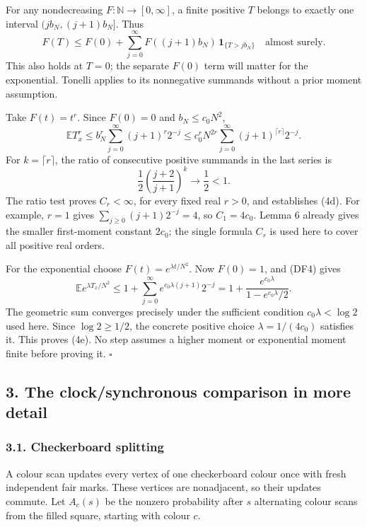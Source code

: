 \documentclass[
  11pt,
  a4paper,
]{article}
\begin{document}
For any nondecreasing \(F:\mathbb N\to[0,\infty]\), a finite positive
\(T\) belongs to exactly one interval \((jb_N,(j+1)b_N]\). Thus \[
F(T)\leq F(0)+\sum_{j=0}^{\infty}
 F((j+1)b_N)\,\mathbf1_{\{T>jb_N\}}
\quad\text{almost surely}.
\tag{DF4}
\] This also holds at \(T=0\); the separate \(F(0)\) term will matter
for the exponential. Tonelli applies to its nonnegative summands without
a prior moment assumption.

Take \(F(t)=t^r\). Since \(F(0)=0\) and \(b_N\leq c_0N^2\), \[
\mathbb E T_x^r
\leq b_N^r\sum_{j=0}^{\infty}(j+1)^r2^{-j}
\leq c_0^rN^{2r}\sum_{j=0}^{\infty}(j+1)^{\lceil r\rceil}2^{-j}.
\] For \(k=\lceil r\rceil\), the ratio of consecutive positive summands
in the last series is \[
\frac12\left(\frac{j+2}{j+1}\right)^k\longrightarrow\frac12<1.
\] The ratio test proves \(C_r<\infty\), for every fixed real \(r>0\),
and establishes (4d). For example, \(r=1\) gives
\(\sum_{j\geq0}(j+1)2^{-j}=4\), so \(C_1=4c_0\). Lemma 6 already gives
the smaller first-moment constant \(2c_0\); the single formula \(C_r\)
is used here to cover all positive real orders.

For the exponential choose \(F(t)=e^{\lambda t/N^2}\). Now \(F(0)=1\),
and (DF4) gives \[
\mathbb E e^{\lambda T_x/N^2}
\leq1+\sum_{j=0}^{\infty}e^{c_0\lambda(j+1)}2^{-j}
=1+\frac{e^{c_0\lambda}}{1-e^{c_0\lambda}/2}.
\] The geometric sum converges precisely under the sufficient condition
\(c_0\lambda<\log2\) used here. Since \(\log2\geq1/2\), the concrete
positive choice \(\lambda=1/(4c_0)\) satisfies it. This proves (4e). No
step assumes a higher moment or exponential moment finite before proving
it. \(\square\)

\subsection{3. The clock/synchronous comparison in more
detail}\label{the-clocksynchronous-comparison-in-more-detail}

\subsubsection{3.1. Checkerboard
splitting}\label{checkerboard-splitting}

A colour scan updates every vertex of one checkerboard colour once with
fresh independent fair marks. These vertices are nonadjacent, so their
updates commute. Let \(A_c(s)\) be the nonzero probability after \(s\)
alternating colour scans from the filled square, starting with colour
\(c\).
\end{document}
